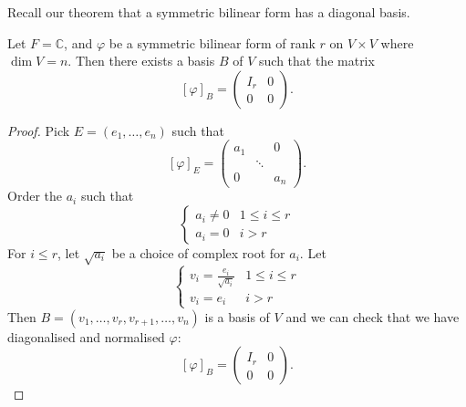\documentclass[a4paper]{scrartcl}
\begin{document}
Recall our theorem that a symmetric bilinear form has a diagonal basis.

\begin{corollary}
    Let $F=\mathbb{C}$, and $\varphi$ be a symmetric bilinear form of rank $r$ on $V \times V$ where $\operatorname{dim}V=n$. Then there exists a basis $B$ of $V$ such that the matrix 
    \[[\varphi]_B=\left(
    \begin{array}{c|c}
     I_r &0\\
     \hline
     0&0
     \end{array}
     \right).\]
\end{corollary}
\begin{proof}
     Pick $E=(e_1, \ldots , e_n)$ such that 
     \[[\varphi]_E=
     \begin{pmatrix}
     a_1&&0\\ &\ddots&\\ 0&&a_n
     \end{pmatrix}
     .\]
     Order the $a_i$ such that 
     \begin{equation*}
          \begin{cases}
              a_i \neq 0 & 1 \leq i \leq r\\
              a_i=0 & i>r
          \end{cases}
     \end{equation*}
     For $i \leq r$, let $\sqrt{a_i}$ be a choice of complex root for $a_i$. Let 
     \begin{equation*}
        \begin{cases}
            v_i=\frac{e_i}{\sqrt{a_i}} & 1 \leq i \leq r\\
            v_i=e_i& i>r
        \end{cases}
   \end{equation*}
   Then $B= (v_1, \ldots ,v_r, v_{r+1}, \ldots , v_n)$ is a basis of $V$ and we can check that we have diagonalised and normalised $\varphi$:
   \[[\varphi]_B=\left(
     \begin{array}{c|c}
      I_r &0\\
      \hline
      0&0
      \end{array}
      \right).\]
\end{proof}
\end{document}
